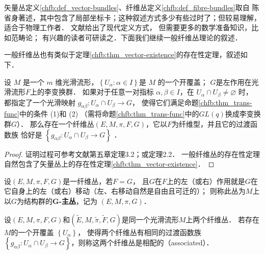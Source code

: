 矢量丛定义\ref{chfb:def_vector-bundles}、纤维丛定义\ref{chfb:def_fibre-bundles}取自
陈省身著述，其中包含了局部坐标卡；这种叙述方式多少有些过时了；但较易理解，适合于物理工作者．
文献\parencite{Husemoller-1994}给出了现代定义方式，%
但需要更多的数学准备知识，比如范畴论；
有兴趣的读者可研读之．下面我们继续一般纤维丛理论的叙述．

一般纤维丛也有类似于定理\ref{chfb:thm_vector-existence}的存在性定理，叙述如下．

\begin{theorem}\label{chfb:thm_fb-existence}
    设 $M$ 是一个 $m$ 维光滑流形，$\left\{U_\alpha: \alpha \in I\right\}$是 $M$ 的一个开覆盖；
    $G$是左作用在光滑流形$F$上的李变换群．
    如果对于任意一对指标 $\alpha, \beta \in I$，在 $U_\alpha \cap U_\beta \neq \varnothing$ 时，
    都指定了一个光滑映射 $g_{\alpha \beta}: U_\alpha \cap U_\beta \rightarrow G$，
    使得它们满足命题\ref{chfb:thm_trans-func}中的条件 (1)和 (2)
    （需将命题\ref{chfb:thm_trans-func}中的$GL(q)$换成李变换群$G$）．
    那么存在一个纤维丛$(E,M,\pi,F,G)$，它以$F$为纤维型，并且它的过渡函数族
    恰好是 $\left\{g_{\alpha \beta}: U_\alpha \cap U_\beta \rightarrow G\right\}$ ．
\end{theorem}

\begin{proof}
    证明过程可参考文献\parencite{Husemoller-1994}第五章定理3.2；或\parencite[\S 10.2]{chen-li-2004v2}定理2.2．
    一般纤维丛的存在性定理自然包含了矢量丛上的存在性定理\ref{chfb:thm_vector-existence}．
\end{proof}



\begin{definition}
    设$(E, M, \pi, F, G)$是一纤维丛，若$F=G$，
    且$G$在$F$上的左（或右）作用就是$G$在它自身上的左（或右）移动（左、右移动自然是自由且可迁的）；
    则称此丛为$M$上以$G$为结构群的{\heiti \bfseries G-主丛}，记为 $(E, M, \pi, G)$．
\end{definition} 

\begin{definition}\label{chfb:def_associated}
    设$(E, M, \pi, F, G)$和$(\widetilde{E}, M, \tilde{\pi}, \widetilde{F}, G)$是同一个光滑流形$M$上两个纤维丛．
    若存在$M$的一个开覆盖 $\left\{U_\alpha\right\}$，
    使得两个纤维丛有相同的过渡函数族$\left\{g_{\alpha \beta}:
    U_\alpha \cap U_\beta \rightarrow G\right\}$，则称这两个纤维丛是{\heiti 相配的}（associated）．
\end{definition} 


